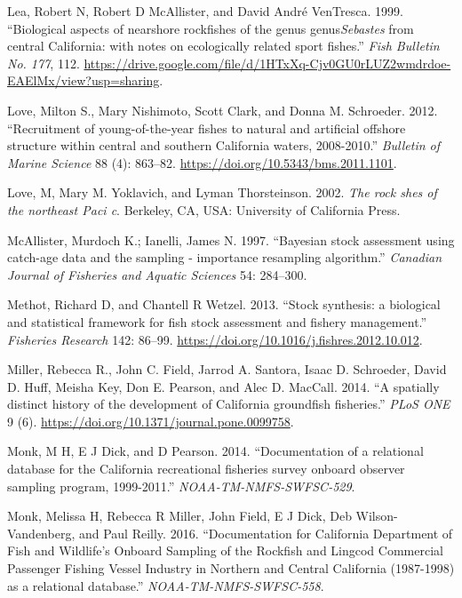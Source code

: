 \documentclass[11pt,
  english,
  a4paper,
]{article}
\newlength{\cslhangindent}
\newenvironment{CSLReferences}[2] %
 {%
  \setlength{\parindent}{0pt}
  \ifodd #1 \everypar{\setlength{\hangindent}{\cslhangindent}}\ignorespaces\fi
  \ifnum #2 > 0
  \setlength{\parskip}{#2\baselineskip}
  \fi
 }%
 {}
\begin{document}
\begin{CSLReferences}{1}{0}
\leavevmode{}%
Lea, Robert N, Robert D McAllister, and David André VenTresca. 1999. {``{Biological aspects of nearshore rockfishes of the genus genus\emph{Sebastes} from central California: with notes on ecologically related sport fishes}.''} \emph{Fish Bulletin No. 177}, 112. \url{https://drive.google.com/file/d/1HTxXq-Cjv0GU0rLUZ2wmdrdoe-EAElMx/view?usp=sharing}.

\leavevmode{}%
Love, Milton S., Mary Nishimoto, Scott Clark, and Donna M. Schroeder. 2012. {``{Recruitment of young-of-the-year fishes to natural and artificial offshore structure within central and southern California waters, 2008-2010}.''} \emph{Bulletin of Marine Science} 88 (4): 863--82. \url{https://doi.org/10.5343/bms.2011.1101}.

\leavevmode{}%
Love, M, Mary M. Yoklavich, and Lyman Thorsteinson. 2002. \emph{{The rock shes of the northeast Paci c}}. Berkeley, CA, USA: University of California Press.

\leavevmode{}%
McAllister, Murdoch K.; Ianelli, James N. 1997. {``{Bayesian stock assessment using catch-age data and the sampling - importance resampling algorithm}.''} \emph{Canadian Journal of Fisheries and Aquatic Sciences} 54: 284--300.

\leavevmode{}%
Methot, Richard D, and Chantell R Wetzel. 2013. {``{Stock synthesis: a biological and statistical framework for fish stock assessment and fishery management}.''} \emph{Fisheries Research} 142: 86--99. \url{https://doi.org/10.1016/j.fishres.2012.10.012}.

\leavevmode{}%
Miller, Rebecca R., John C. Field, Jarrod A. Santora, Isaac D. Schroeder, David D. Huff, Meisha Key, Don E. Pearson, and Alec D. MacCall. 2014. {``{A spatially distinct history of the development of California groundfish fisheries}.''} \emph{PLoS ONE} 9 (6). \url{https://doi.org/10.1371/journal.pone.0099758}.

\leavevmode{}%
Monk, M H, E J Dick, and D Pearson. 2014. {``{Documentation of a relational database for the California recreational fisheries survey onboard observer sampling program, 1999-2011}.''} \emph{NOAA-TM-NMFS-SWFSC-529}.

\leavevmode{}%
Monk, Melissa H, Rebecca R Miller, John Field, E J Dick, Deb Wilson-Vandenberg, and Paul Reilly. 2016. {``{Documentation for California Department of Fish and Wildlife's Onboard Sampling of the Rockfish and Lingcod Commercial Passenger Fishing Vessel Industry in Northern and Central California (1987-1998) as a relational database}.''} \emph{NOAA-TM-NMFS-SWFSC-558}.


\end{CSLReferences}
\end{document}
